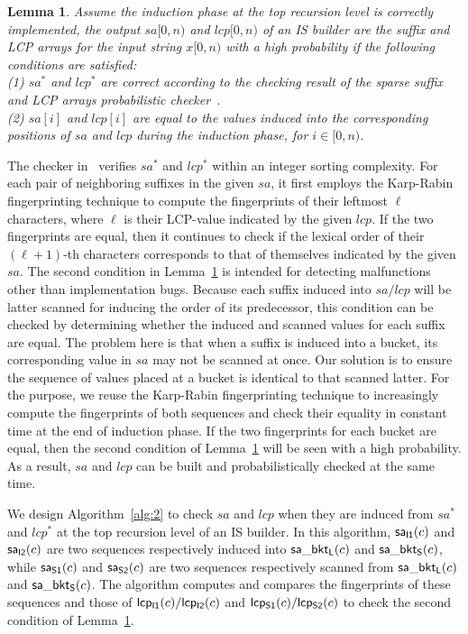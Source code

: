 \documentclass[10pt,journal,compsoc]{IEEEtran}
\newtheorem{lemma}[theorem]{Lemma}
\begin{document}
\begin{lemma} \label{lemma:3}
	Assume the induction phase at the top recursion level is correctly implemented, the output $sa[0, n)$ and $lcp[0, n)$ of an IS builder are the suffix and LCP arrays for the input string $x[0, n)$ with a high probability if the following conditions are satisfied: \\
	(1) $sa^*$ and $lcp^*$ are correct according to the checking result of the sparse suffix and LCP arrays probabilistic checker~\cite{wu2017}. \\
	(2) $sa[i]$ and $lcp[i]$ are equal to the values induced into the corresponding positions of $sa$ and $lcp$ during the induction phase, for $i \in [0, n)$. \\
\end{lemma}


The checker in~\cite{wu2017} verifies $sa^*$ and $lcp^*$ within an integer sorting complexity. For each pair of neighboring suffixes in the given $sa$, it first employs the Karp-Rabin fingerprinting technique to compute the fingerprints of their leftmost $\ell$ characters, where $\ell$ is their LCP-value indicated by the given $lcp$. If the two fingerprints are equal, then it continues to check if the lexical order of  their $(\ell + 1)$-th characters corresponds to that of themselves indicated by the given $sa$. The second condition in Lemma~\ref{lemma:3} is intended for detecting malfunctions other than implementation bugs. Because each suffix induced into $sa/lcp$ will be latter scanned for inducing the order of its predecessor, this condition can be checked by determining whether the induced and scanned values for each suffix are equal. The problem here is that when a suffix is induced into a bucket, its corresponding value in $sa$ may not be scanned at once. Our solution is to ensure the sequence of values placed at a bucket is identical to that scanned latter. For the purpose, we reuse the Karp-Rabin fingerprinting technique to increasingly compute the fingerprints of both sequences and check their equality in constant time at the end of induction phase. If the two fingerprints for each bucket are equal, then the second condition of Lemma~\ref{lemma:3} will be seen with a high probability. As a result, $sa$ and $lcp$ can be built and probabilistically checked at the same time. 

We design Algorithm~\ref{alg:2} to check $sa$ and $lcp$ when they are induced from $sa^*$ and $lcp^*$ at the top recursion level of an IS builder. In this algorithm, ${\sf sa_{I1}}(c)$ and ${\sf sa_{I2}}(c)$ are two sequences respectively induced into ${\sf sa\_bkt_L}(c)$ and ${\sf sa\_bkt_S}(c)$, while ${\sf sa_{S1}}(c)$ and ${\sf sa_{S2}}(c)$ are two sequences respectively scanned from ${\sf sa\_bkt_L}(c)$ and ${\sf sa\_bkt_S}(c)$. The algorithm computes and compares the fingerprints of these sequences and those of ${\sf lcp_{I1}}(c)/{\sf lcp_{I2}}(c)$ and ${\sf lcp_{S1}}(c)/{\sf lcp_{S2}}(c)$ to check the second condition of Lemma~\ref{lemma:3}. 
\end{document}
